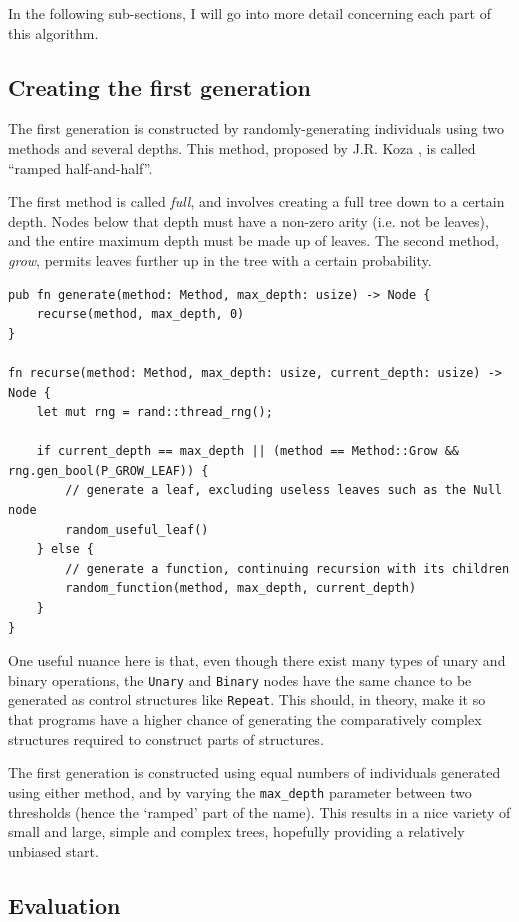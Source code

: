 \documentclass{report}
\begin{document}
In the following sub-sections, I will go into more detail concerning each part of this algorithm.

\subsection{Creating the first generation}

The first generation is constructed by randomly-generating individuals using two methods and several depths. This method, proposed by J.R. Koza \cite{koza}, is called ``ramped half-and-half''.

The first method is called \emph{full}, and involves creating a full tree down to a certain depth. Nodes below that depth must have a non-zero arity (i.e. not be leaves), and the entire maximum depth must be made up of leaves. The second method, \emph{grow}, permits leaves further up in the tree with a certain probability.

\begin{verbatim}
pub fn generate(method: Method, max_depth: usize) -> Node {
    recurse(method, max_depth, 0)
}

fn recurse(method: Method, max_depth: usize, current_depth: usize) -> Node {
    let mut rng = rand::thread_rng();

    if current_depth == max_depth || (method == Method::Grow && rng.gen_bool(P_GROW_LEAF)) {
        // generate a leaf, excluding useless leaves such as the Null node
        random_useful_leaf()
    } else {
        // generate a function, continuing recursion with its children
        random_function(method, max_depth, current_depth)
    }
}
\end{verbatim}

One useful nuance here is that, even though there exist many types of unary and binary operations, the \verb|Unary| and \verb|Binary| nodes have the same chance to be generated as control structures like \verb|Repeat|. This should, in theory, make it so that programs have a higher chance of generating the comparatively complex structures required to construct parts of structures.

The first generation is constructed using equal numbers of individuals generated using either method, and by varying the \verb|max_depth| parameter between two thresholds (hence the `ramped' part of the name). This results in a nice variety of small and large, simple and complex trees, hopefully providing a relatively unbiased start.

\subsection{Evaluation}
\end{document}
